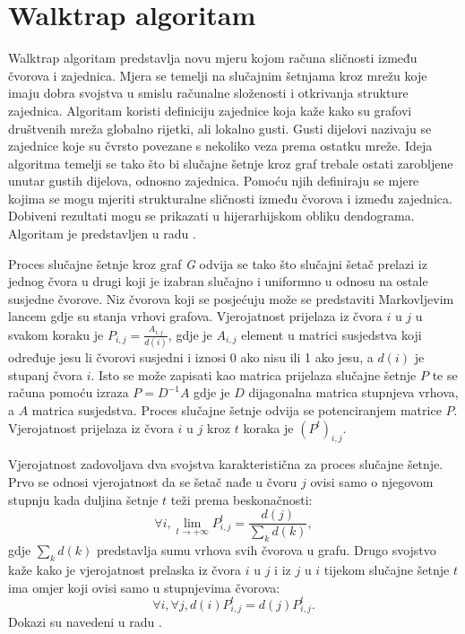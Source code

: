 \documentclass[times, utf8, diplomski]{fer}
\begin{document}
\section{Walktrap algoritam}
Walktrap algoritam predstavlja novu mjeru kojom računa sličnosti između čvorova i zajednica. Mjera se temelji na slučajnim šetnjama kroz mrežu koje imaju dobra svojstva u smislu računalne složenosti i otkrivanja strukture zajednica. Algoritam koristi definiciju zajednice koja kaže kako su grafovi društvenih mreža globalno rijetki, ali lokalno gusti. Gusti dijelovi nazivaju se zajednice koje su čvrsto povezane s nekoliko veza prema ostatku mreže. Ideja algoritma temelji se tako što bi slučajne šetnje kroz graf trebale ostati zarobljene unutar gustih dijelova, odnosno zajednica. Pomoću njih definiraju se mjere kojima se mogu mjeriti strukturalne sličnosti između čvorova i između zajednica. Dobiveni rezultati mogu se prikazati u hijerarhijskom obliku dendograma. Algoritam je predstavljen u radu \cite{pons2005computing}.

Proces slučajne šetnje kroz graf \textit{G} odvija se tako što slučajni šetač prelazi iz jednog čvora u drugi koji je izabran slučajno i uniformno u odnosu na ostale susjedne čvorove. Niz čvorova koji se posjećuju može se predstaviti Markovljevim lancem gdje su stanja vrhovi grafova. Vjerojatnost prijelaza iz čvora $i$ u $j$ u svakom koraku je $ P_{i,j} = \frac{A_{i,j}}{d(i)} $, gdje je $A_{i,j}$ element u matrici susjedstva koji određuje jesu li čvorovi susjedni i iznosi 0 ako nisu ili 1 ako jesu, a $d(i)$ je stupanj čvora $i$. Isto se može zapisati kao matrica prijelaza slučajne šetnje $P$ te se računa pomoću izraza $P = D^{-1}A$ gdje je $D$ dijagonalna matrica stupnjeva vrhova, a $A$ matrica susjedstva. Proces slučajne šetnje odvija se potenciranjem matrice $P$. Vjerojatnost prijelaza iz čvora $i$ u $j$ kroz $t$ koraka je $(P^{t})_{i,j}$. 

Vjerojatnost zadovoljava dva svojstva karakteristična za proces slučajne šetnje. Prvo se odnosi vjerojatnost da se šetač nađe u čvoru $j$ ovisi samo o njegovom stupnju kada duljina šetnje $t$ teži prema beskonačnosti:
\begin{equation} \label{svojstvo1}
	\forall i, \lim_{t\to+\infty} P_{i,j}^{t} = \frac{d(j)}{\sum_{k}d(k)},
\end{equation}
gdje $\sum_{k}d(k)$ predstavlja sumu vrhova svih čvorova u grafu.
Drugo svojstvo kaže kako je vjerojatnost prelaska iz čvora $i$ u $j$ i iz $j$ u $i$ tijekom slučajne šetnje $t$ ima omjer koji ovisi samo u stupnjevima čvorova: 
\begin{equation} \label{svojstvo2}
	\forall i, \forall j, d(i) P_{i,j}^{t} = d(j) P_{i,j}^{t}.
\end{equation}
Dokazi su navedeni u radu \cite{pons2005computing}.
\end{document}
